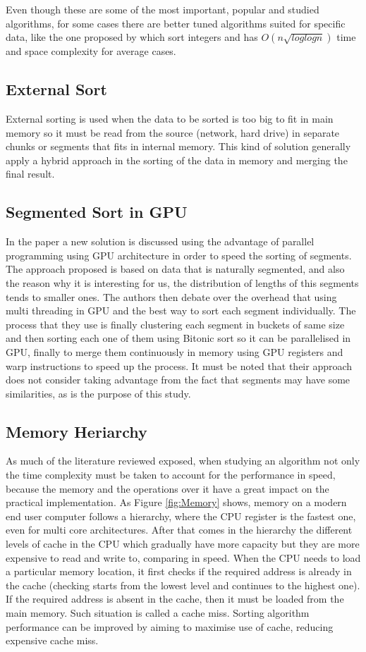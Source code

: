 \documentclass[a4paper,12pt]{article}
\begin{document}
Even though these are some of the most important, popular and studied algorithms, for some cases there are better tuned algorithms suited for specific data, like the one proposed by \cite{han2002integer}  which sort integers and has {$O(n \sqrt{log log n})$} time and space complexity for average cases.

\subsection {External Sort} \label{ExternalSorting}
External sorting is used when the data to be sorted is too big to fit in main memory so it must be read from the source (network, hard drive) in separate chunks or segments that fits in internal memory. This kind of solution generally apply a hybrid approach in the sorting of the data in memory and merging the final result. 

\subsection{Segmented Sort in GPU} 
In the paper \cite{hou2017fast} a new solution is discussed using the advantage of parallel programming using GPU architecture in order to speed the sorting of segments. The approach proposed is based on data that is naturally segmented, and also the reason why it is interesting for us, the distribution of lengths of this segments tends to smaller ones. The authors then debate over the overhead that using multi threading in GPU and the best way to sort each segment individually. The process that they use is finally clustering each segment in buckets of same size and then sorting each one of them using Bitonic sort \cite{batcher1968sorting} so it can be parallelised in GPU, finally to merge them continuously in memory using GPU registers and warp instructions to speed up the process. It must be noted that their approach does not consider taking advantage from the fact that segments may have some similarities, as is the purpose of this study.

\subsection{Memory Heriarchy}
As much of the literature reviewed exposed, when studying an algorithm not only the time complexity must be taken to account for the performance in speed, because the memory and the operations over it have a great impact on the practical implementation. As Figure \ref{fig:Memory} shows, memory on a modern end user computer follows a hierarchy, where the CPU register is the fastest one, even for multi core architectures. After that comes in the hierarchy the different levels of cache in the CPU which gradually have more capacity but they are more expensive to read and write to, comparing in speed. When the CPU needs to load a particular memory location, it first checks if the required address is already in the cache (checking starts from the lowest level and continues to the highest one). If the required address is absent in the cache, then it must be loaded from the main memory. Such situation is called a cache miss. Sorting algorithm  performance can be improved by aiming to maximise use of cache, reducing expensive cache miss.
\end{document}
